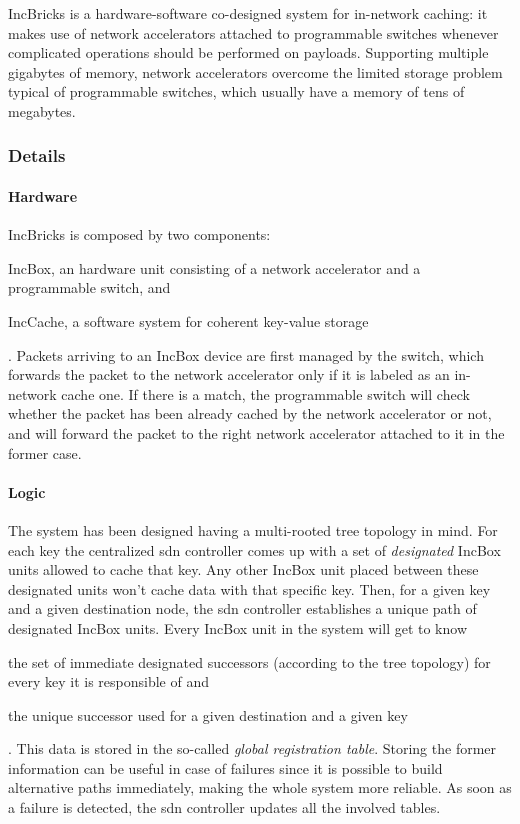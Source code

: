 IncBricks \cite{incbricks} is a hardware-software co-designed system for in-network caching: it makes use of network accelerators attached to programmable switches whenever complicated operations should be performed on payloads.
Supporting multiple gigabytes of memory, network accelerators overcome the limited storage problem typical of programmable switches, which usually have a memory of tens of megabytes.

\subsubsection{Details}
\paragraph{Hardware}
IncBricks \cite{incbricks} is composed by two components:
\begin{mylist}
    \item IncBox, an hardware unit consisting of a network accelerator and a programmable switch, and
    \item IncCache, a software system for coherent key-value storage
\end{mylist}.
Packets arriving to an IncBox device are first managed by the switch, which forwards the packet to the network accelerator only if it is labeled as an in-network cache one.
If there is a match, the programmable switch will check whether the packet has been already cached by the network accelerator or not, and will forward the packet to the right network accelerator attached to it in the former case.
\paragraph{Logic}
The system has been designed having a multi-rooted tree topology in mind.
For each key the centralized \gls{sdn} controller comes up with a set of \textit{designated} IncBox units allowed to cache that key.
Any other IncBox unit placed between these designated units won't cache data with that specific key.
Then, for a given key and a given destination node, the \gls{sdn} controller establishes a unique path of designated IncBox units.
Every IncBox unit in the system will get to know
\begin{mylist}
    \item the set of immediate designated successors (according to the tree topology) for every key it is responsible of and
    \item the unique successor used for a given destination and a given key
\end{mylist}.
This data is stored in the so-called \textit{global registration table}.
Storing the former information can be useful in case of failures since it is possible to build alternative paths immediately, making the whole system more reliable.
As soon as a failure is detected, the \gls{sdn} controller updates all the involved tables.

